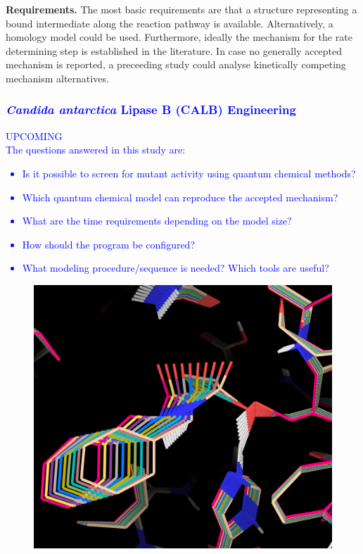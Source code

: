 \textbf{Requirements.}
The most basic requirements are that a structure representing a bound intermediate along the reaction pathway is available.
Alternatively, a homology model could be used.
Furthermore, ideally the mechanism for the rate determining step is established in the literature.
In case no generally accepted mechanism is reported, a preceeding study could analyse kinetically competing mechanism alternatives.

\textcolor{blue}{
\subsubsection{{\textit{Candida antarctica} Lipase B (CALB) Engineering}}
UPCOMING\\
The questions answered in this study are:
\begin{itemize}
\item Is it possible to screen for mutant activity using quantum chemical methods?
\item Which quantum chemical model can reproduce the accepted mechanism?
\item What are the time requirements depending on the model size?
\item How should the program be configured?
\item What modeling procedure/sequence is needed? Which tools are useful?
\end{itemize}
\begin{figure}[htbp] 
\centering
\begin{minipage}{0.43\linewidth}
\includegraphics[width=0.90\linewidth]{wt-ini.png}

\end{minipage}
\end{figure}}
